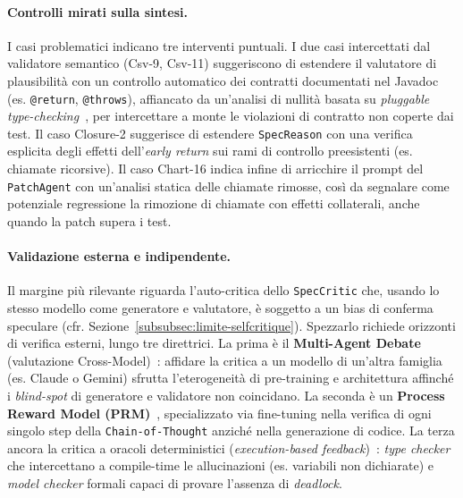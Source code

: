 \paragraph{Controlli mirati sulla sintesi.} I casi problematici indicano tre interventi puntuali.
I due casi intercettati dal validatore semantico (Csv-9, Csv-11) suggeriscono di estendere il
valutatore di plausibilità con un controllo automatico dei contratti documentati nel Javadoc
(es. \texttt{@return}, \texttt{@throws}), affiancato da un'analisi di nullità basata su
\textit{pluggable type-checking}~\cite{papi2008practical}, per intercettare a monte le violazioni di
contratto non coperte dai test. Il caso Closure-2 suggerisce di estendere \texttt{SpecReason} con una
verifica esplicita degli effetti dell'\textit{early return} sui rami di controllo preesistenti
(es. chiamate ricorsive). Il caso Chart-16 indica infine di arricchire il prompt del
\texttt{PatchAgent} con un'analisi statica delle chiamate rimosse, così da segnalare come potenziale
regressione la rimozione di chiamate con effetti collaterali, anche quando la patch supera i test.

\paragraph{Validazione esterna e indipendente.} Il margine più rilevante riguarda l'auto-critica
dello \texttt{SpecCritic} che, usando lo stesso modello come generatore e valutatore, è soggetto a un
bias di conferma speculare (cfr. Sezione~\ref{subsubsec:limite-selfcritique}). Spezzarlo richiede
orizzonti di verifica esterni, lungo tre direttrici. La prima è il \textbf{Multi-Agent Debate}
(valutazione Cross-Model)~\cite{du2023improving}: affidare la critica a un modello di un'altra famiglia
(es. Claude o Gemini) sfrutta l'eterogeneità di pre-training e architettura affinché i
\textit{blind-spot} di generatore e validatore non coincidano. La seconda è un \textbf{Process Reward
Model (PRM)}~\cite{lightman2023lets}, specializzato via fine-tuning nella verifica di ogni singolo step
della \texttt{Chain-of-Thought} anziché nella generazione di codice. La terza ancora la critica a
oracoli deterministici (\textit{execution-based feedback})~\cite{shinn2023reflexion}: \textit{type
checker} che intercettano a compile-time le allucinazioni (es. variabili non dichiarate) e
\textit{model checker} formali capaci di provare l'assenza di \textit{deadlock}.

